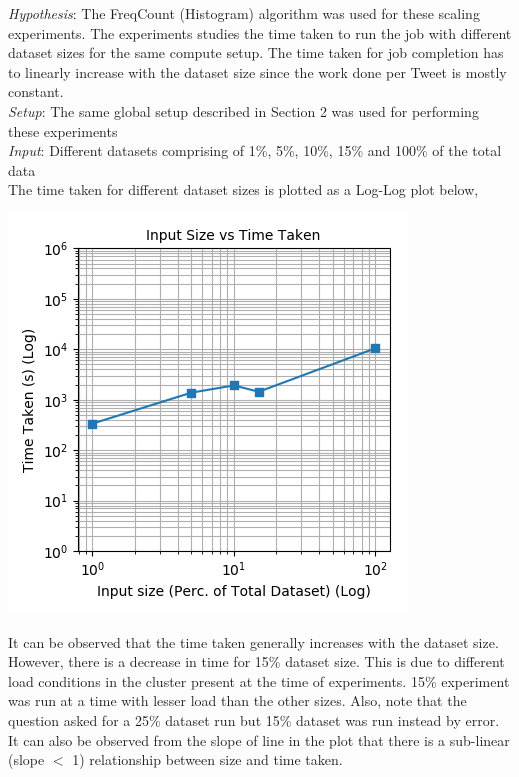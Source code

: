 \documentclass[11pt,a4paper,oneside]{article}
\begin{document}
    \emph{Hypothesis}: The FreqCount (Histogram) algorithm was used for these scaling experiments. The experiments studies the time taken to run the job with different dataset sizes for the same compute setup. The time taken for job completion has to linearly increase with the dataset size since the work done per Tweet is mostly constant. \\
    \emph{Setup}: The same global setup described in Section 2 was used for performing these experiments \\
    \emph{Input}: Different datasets comprising of 1\%, 5\%, 10\%, 15\% and 100\% of the total data  \\    
    The time taken for different dataset sizes is plotted as a Log-Log plot below,  
    
    \begin{center}
    	\includegraphics[scale=0.6]{3.png}		
    \end{center}    

    It can be observed that the time taken generally increases with the dataset size. However, there is a decrease in time for 15\% dataset size. This is due to different load conditions in the cluster present at the time of experiments. 15\% experiment was run at a time with lesser load than the other sizes. Also, note that the question asked for a 25\% dataset run but 15\% dataset was run instead by error. \\
    
    It can also be observed from the slope of line in the plot that there is a sub-linear (slope $<$ 1) relationship between size and time taken. 
    
\end{document}
